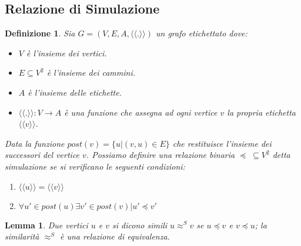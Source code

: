 \documentclass[12pt,a4paper,openright,twoside]{report}
\newtheorem{definition}{Definizione}
\newtheorem{lemma}{Lemma}
\theoremstyle{definition}
\begin{document}
\subsection{Relazione di Simulazione}
\begin{definition}
Sia $G = (V, E,A, \langle\langle.\rangle\rangle)$ un grafo etichettato dove: 
\begin{itemize}
\item $V$ è l'insieme dei vertici.
\item $E \subseteq V^2$ è l'insieme dei cammini.
\item $A$ è l'insieme delle etichette.
\item $\langle\langle.\rangle\rangle:V \to A$ è una funzione che assegna ad ogni vertice $v$ la propria etichetta $\langle\langle v\rangle\rangle$.
\end{itemize}
Data la funzione $post(v) = \{u|(v,u) \in E\}$ che restituisce l'insieme dei successori del vertice $v$.
Possiamo definire una relazione binaria $\preceq\;\subseteq V^2$ detta \emph{simulazione} se si verificano le seguenti condizioni:
\begin{enumerate}
\item $\langle\langle u \rangle\rangle = \langle\langle v \rangle\rangle$
\item $\forall u' \in post(u) \exists v' \in post(v) | u' \preceq v'$
\end{enumerate}
\end{definition}
\begin{lemma}
Due vertici $u$ e $v$ si dicono simili $u\approx^Sv$ se $u \preceq v$ e $v \preceq u$; la \emph{similarità} $\approx^S$ è una relazione di equivalenza.
\end{lemma}
\end{document}
